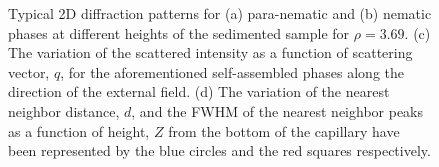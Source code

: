 \documentclass[aps,prl,preprint,superscriptaddress,showkeys]{revtex4-2} %
\begin{document}
\begin{figure}[t]
\caption{Typical 2D diffraction patterns for (a) para-nematic and (b) nematic phases at different heights of the sedimented sample for $\rho=3.69$. (c) The variation of the scattered intensity as a function of scattering vector, $q$, for the aforementioned self-assembled phases along the direction of the external field. (d) The variation of the nearest neighbor distance, $d$, and the FWHM of the nearest neighbor peaks as a function of height, $Z$ from the bottom of the capillary have been represented by the blue circles and the red squares respectively.}\label{z_scan_high}
\end{figure}

\end{document}
